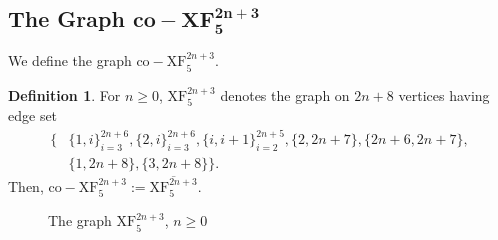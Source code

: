 \documentclass[12pt,a4paper]{amsart}
\theoremstyle{plain}
\theoremstyle{definition}
\newtheorem{defn}[thrm]{Definition}
\def\bdefn{\begin{defn}}
\def\edefn{\end{defn}}
\theoremstyle{remark}
\newcommand{\ol}[1]{\overline{#1}}
\begin{document}
\subsection{The Graph $\mathbf{co\!-\!XF_5^{2n+3}}$}

We define the graph $\mathrm{co\!-\!XF}_5^{2n+3}$.
\bdefn
\label{defn:Jn1}
For $n \geq 0$, $\mathrm{XF}_5^{2n+3}$ denotes the graph on $2n+8$ vertices having edge set 
\begin{align*}
\{ &\{1,i\}_{i = 3}^{2n+6}, \{2,i\}_{i = 3}^{2n+6}, \{i,i+1\}_{i=2}^{2n+5}, \{2, 2n+7\}, \{2n+6, 2n+7\},\\
&\{1,2n+8\}, \{3,2n+8\} \}.
\end{align*}
Then, $\mathrm{co\!-\!XF}_5^{2n+3} := \ol{\mathrm{XF}_5^{2n+3}}$.
\edefn


\def\edJnO{2}

\def\ptsJnO{.382683*\edJnO/-.92388*\edJnO/2/0,
.92388*\edJnO/-.382683*\edJnO/3/0,
.92388*\edJnO/.382683*\edJnO/4/0,
.382683*\edJnO/.92388*\edJnO/5/0,
-.92388*\edJnO/-.382683*\edJnO/2n+6/180,
-.382683*\edJnO/-.92388*\edJnO/1/180,
3*0.6532815*\edJn/3*-0.6532815*\edJn/2n+8/0,
3*-0.6532815*\edJn/3*-0.6532815*\edJn/2n+7/180
,
-.92388*\edJn/.382683*\edJn/2n+5/180
}
    
\def\ptsJnOUnlabel{-.382683*\edJnO/.92388*\edJnO/6}

\def\edgesJnO{
    2/3,
    2/4,
    2/5,
    2/6,
    2/2n+5,
    2/2n+5,
    3/4,
    4/5,
    6/2n+5,
    2n+5/2n+6,
    2n+5/1,
    3/1,
    4/1,
    5/1,
    6/1,
    2n+5/1,
    2n+6/2n+7,
    2/2n+7,
    3/2n+8,
    1/2n+8,
    1/2n+6}

\begin{figure}[htb]
\begin{center}
\end{center}
\caption{The graph $\mathrm{XF}_5^{2n+3}$, $n\geq 0$} \label{graph:JnO}
\end{figure}
\end{document}
